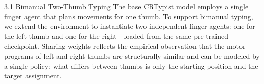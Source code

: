 \documentclass[sigconf,review,anonymous]{acmart}
\begin{document}

  

\keywords{}
  
\begin{teaserfigure}
  \def\w{\linewidth}
  \centering
  \label{fig:teaser}
\end{teaserfigure}



\maketitle





3.1 Bimanual Two-Thumb Typing
The base CRTypist model employs a single finger agent that plans movements for one thumb. To support bimanual typing, we extend the environment to instantiate two independent finger agents: one for the left thumb and one for the right—loaded from the same pre-trained checkpoint. Sharing weights reflects the empirical observation that the motor programs of left and right thumbs are structurally similar and can be modeled by a single policy; what differs between thumbs is only the starting position and the target assignment.
\end{document}
